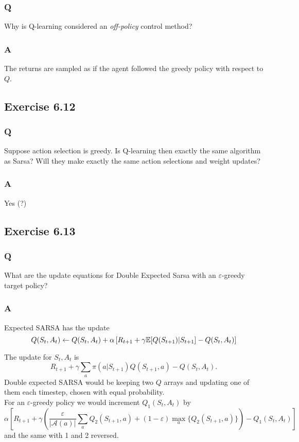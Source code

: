 \subsubsection{Q}
Why is Q-learning considered an \emph{off-policy} control method?

\subsubsection{A}
The returns are sampled as if the agent followed the greedy policy with respect to $Q$.

\subsection{Exercise 6.12}
\subsubsection{Q}
Suppose action selection is greedy. Is Q-learning then exactly the same algorithm as Sarsa? Will they make exactly the same action selections and weight updates?
\subsubsection{A}
Yes (?)

\subsection{Exercise 6.13}
\subsubsection{Q}
What are the update equations for Double Expected Sarsa with an $\varepsilon$-greedy target policy?
\subsubsection{A}
Expected SARSA has the update 
\[
    Q(S_t, A_t) \leftarrow Q(S_t, A_t) + \alpha \left[ R_{t+1} + \gamma \mathbb{E}{}[Q(S_{t+1}) | S_{t+1}] - Q(S_t, A_t)\right]
\]

The update for $S_t, A_t$ is 
\[
    R_{t+1} + \gamma \sum_a \pi(a|S_{t+1}) Q(S_{t+1}, a) - Q(S_t, A_t).
\]
Double expected SARSA would be keeping two $Q$ arrays and updating one of them each timestep, chosen with equal probability.\\

For an $\varepsilon$-greedy policy we would increment $Q_1(S_t, A_t)$ by
\begin{equation}
    \alpha \left[ R_{t+1} + \gamma \left( \frac{\varepsilon}{|\mathcal{A}(a)|} \sum_a Q_2(S_{t+1}, a) + (1-\varepsilon)\max_a\{Q_2(S_{t+1}, a)\} \right) - Q_1(S_t, A_t)  \right]
\end{equation}
and the same with 1 and 2 reversed.


